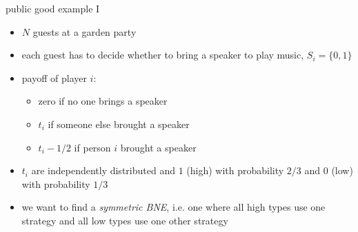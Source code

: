 \documentclass[bigger]{beamer}
\begin{document}
\begin{frame}[label={sec:orgf065b30}]{public good example I}
\begin{itemize}
\item \(N\) guests at a garden party
\item each guest has to decide whether to bring a speaker to play music, \(S_i=\{0,1\}\)
\item payoff of player \(i\):
\begin{itemize}
\item zero if no one brings a speaker
\item \(t_i\) if someone else brought a speaker
\item \(t_i-1/2\) if person \(i\) brought a speaker
\end{itemize}
\item \(t_i\) are independently distributed and \(1\) (high) with probability \(2/3\) and \(0\) (low) with probability \(1/3\)
\item we want to find a \emph{symmetric BNE}, i.e. one where all high types use one strategy and all low types use one other strategy
\end{itemize}
\end{frame}
\end{document}

